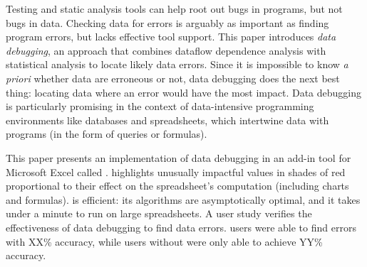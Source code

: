 Testing and static analysis tools can help root out bugs in programs,
but not bugs in data. Checking data for errors is arguably as
important as finding program errors, but lacks effective tool
support. This paper introduces \emph{data debugging}, an approach that
combines dataflow dependence analysis with statistical analysis to
locate likely data errors. Since it is impossible to know \emph{a
priori} whether data are erroneous or not, data debugging does the
next best thing: locating data where an error would have the most
impact. Data debugging is particularly promising in the context of
data-intensive programming environments like databases and
spreadsheets, which intertwine data with programs (in the form of
queries or formulas).

This paper presents an implementation of data debugging in an add-in
tool for Microsoft Excel called \checkcell{}. \checkcell{} highlights
unusually impactful values in shades of red proportional to their
effect on the spreadsheet's computation (including charts and 
formulas). \checkcell{} is efficient: its algorithms are asymptotically
optimal, and it takes under a minute to run on large spreadsheets. A
user study verifies the effectiveness of data debugging to find
data errors. \checkcell{} users were able to find errors with XX\%
accuracy, while users without were only able to achieve YY\% accuracy.
